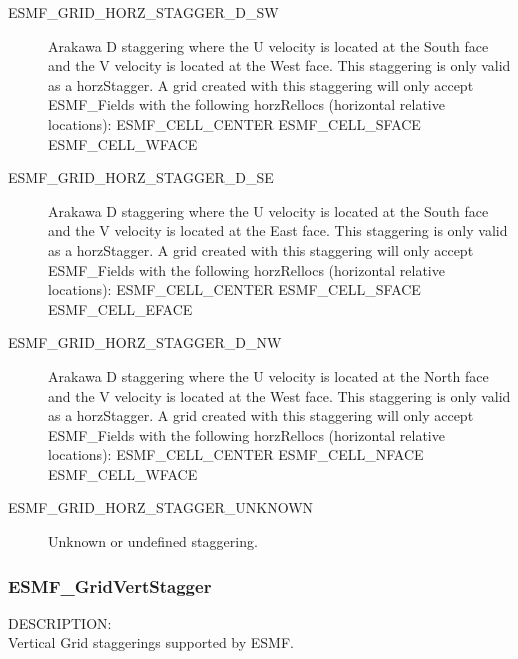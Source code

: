 \begin{description}
   \item [ESMF\_GRID\_HORZ\_STAGGER\_D\_SW]
         Arakawa D staggering where the U velocity is located at the South face
         and the V velocity is located at the West face.  This staggering is
         only valid as a horzStagger.  A grid created with this staggering will
         only accept ESMF\_Fields with the following horzRellocs (horizontal
         relative locations):
             ESMF\_CELL\_CENTER
             ESMF\_CELL\_SFACE
             ESMF\_CELL\_WFACE

   \item [ESMF\_GRID\_HORZ\_STAGGER\_D\_SE]
         Arakawa D staggering where the U velocity is located at the South face
         and the V velocity is located at the East face.  This staggering is
         only valid as a horzStagger.  A grid created with this staggering will
         only accept ESMF\_Fields with the following horzRellocs (horizontal
         relative locations):
             ESMF\_CELL\_CENTER
             ESMF\_CELL\_SFACE
             ESMF\_CELL\_EFACE

   \item [ESMF\_GRID\_HORZ\_STAGGER\_D\_NW]
         Arakawa D staggering where the U velocity is located at the North face
         and the V velocity is located at the West face.  This staggering is
         only valid as a horzStagger.  A grid created with this staggering will
         only accept ESMF\_Fields with the following horzRellocs (horizontal
         relative locations):
             ESMF\_CELL\_CENTER
             ESMF\_CELL\_NFACE
             ESMF\_CELL\_WFACE


   \item [ESMF\_GRID\_HORZ\_STAGGER\_UNKNOWN]
         Unknown or undefined staggering.

\end{description}

\subsubsection{ESMF\_GridVertStagger}

{\sf DESCRIPTION:\\}
Vertical Grid staggerings supported by ESMF.


